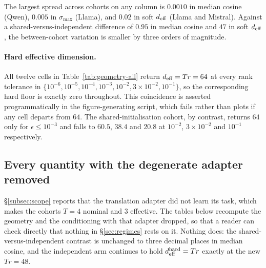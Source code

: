 The largest spread across cohorts on any column is $0.0010$ in median
cosine (Qwen), $0.005$ in $\sigma_{\max}$ (Llama), and $0.02$ in soft
$d_{\mathrm{eff}}$ (Llama and Mistral). Against a shared-versus-independent
difference of $0.95$ in median cosine and $47$ in soft $d_{\mathrm{eff}}$, the
between-cohort variation is smaller by three orders of magnitude.

\paragraph{Hard effective dimension.} All twelve cells in
Table~\ref{tab:geometry-all} return $d_{\mathrm{eff}} = Tr = 64$ at every rank
tolerance in $\{10^{-6}, 10^{-5}, 10^{-4}, 10^{-3}, 10^{-2},
3\times10^{-2}, 10^{-1}\}$, so the corresponding hard floor is exactly
zero throughout. This coincidence is asserted programmatically in the
figure-generating script, which fails rather than plots if any cell
departs from $64$. The shared-initialisation cohort, by contrast, returns
$64$ only for $\epsilon \leq 10^{-3}$ and falls to $60.5$, $38.4$ and
$20.8$ at $10^{-2}$, $3\times10^{-2}$ and $10^{-1}$ respectively.

\subsection{Every quantity with the degenerate adapter removed}
\label{app:t3}

\S\ref{subsec:scope} reports that the translation adapter did not learn
its task, which makes the cohorts $T = 4$ nominal and $3$ effective. The
tables below recompute the geometry and the conditioning with that adapter
dropped, so that a reader can check directly that nothing in
\S\ref{sec:regimes} rests on it. Nothing does: the
shared-versus-independent contrast is unchanged to three decimal places in
median cosine, and the independent arm continues to hold
$d_{\mathrm{eff}}^{\mathrm{hard}} = Tr$ exactly at the new $Tr = 48$.

